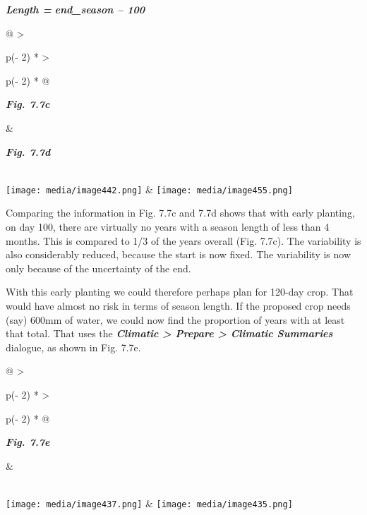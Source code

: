 \documentclass[
  letterpaper,
  DIV=11,
  numbers=noendperiod]{scrreprt}
\begin{document}
\textbf{\emph{Length =}} \textbf{\emph{end\_season -- 100}}

\begin{longtable}[]{@{}
  >{\raggedright\arraybackslash}p{(\columnwidth - 2\tabcolsep) * }
  >{\raggedright\arraybackslash}p{(\columnwidth - 2\tabcolsep) * }@{}}
\toprule\noalign{}
\begin{minipage}[b]{\linewidth}\raggedright
\textbf{\emph{Fig. 7.7c}}
\end{minipage} & \begin{minipage}[b]{\linewidth}\raggedright
\textbf{\emph{Fig. 7.7d}}
\end{minipage} \\
\midrule\noalign{}
\endhead
\bottomrule\noalign{}
\endlastfoot
\texttt{[image: media/image442.png]} &
\texttt{[image: media/image455.png]} \\
\end{longtable}

Comparing the information in Fig. 7.7c and 7.7d shows that with early
planting, on day 100, there are virtually no years with a season length
of less than 4 months. This is compared to 1/3 of the years overall
(Fig. 7.7c). The variability is also considerably reduced, because the
start is now fixed. The variability is now only because of the
uncertainty of the end.

With this early planting we could therefore perhaps plan for 120-day
crop. That would have almost no risk in terms of season length. If the
proposed crop needs (say) 600mm of water, we could now find the
proportion of years with at least that total. That uses the
\textbf{\emph{Climatic \textgreater{} Prepare \textgreater{} Climatic
Summaries}} dialogue, as shown in Fig. 7.7e.

\begin{longtable}[]{@{}
  >{\raggedright\arraybackslash}p{(\columnwidth - 2\tabcolsep) * }
  >{\raggedright\arraybackslash}p{(\columnwidth - 2\tabcolsep) * }@{}}
\toprule\noalign{}
\begin{minipage}[b]{\linewidth}\raggedright
\textbf{\emph{Fig. 7.7e}}
\end{minipage} & \begin{minipage}[b]{\linewidth}\raggedright
\end{minipage} \\
\midrule\noalign{}
\endhead
\bottomrule\noalign{}
\endlastfoot
\texttt{[image: media/image437.png]} &
\texttt{[image: media/image435.png]} \\
\end{longtable}
\end{document}
